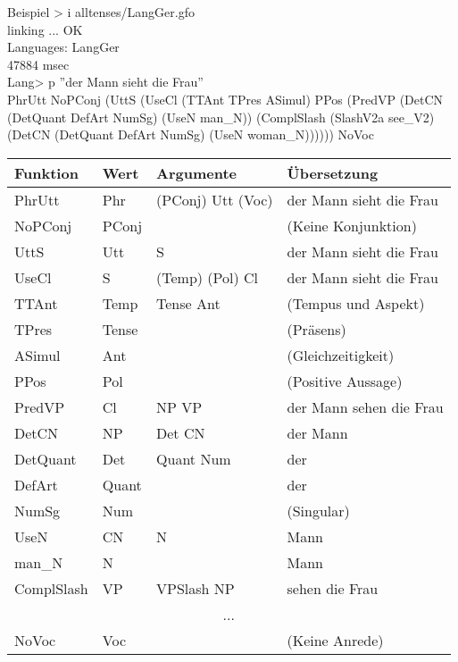 \documentclass{beamer}
\begin{document}
\begin{frame}

\begin{block}{Beispiel}
{\scriptsize\ttfamily
> i alltenses/LangGer.gfo \\
linking ... OK \\
Languages: LangGer \\
47884 msec \\
Lang> p ''der Mann sieht die Frau'' \\
PhrUtt NoPConj (UttS (UseCl (TTAnt TPres ASimul) PPos (PredVP (DetCN (DetQuant DefArt NumSg) (UseN man\_N)) (ComplSlash (SlashV2a see\_V2) (DetCN (DetQuant DefArt NumSg) (UseN woman\_N)))))) NoVoc
}
\end{block}
{\tiny
\begin{tabular}{|l|l|l|l|}
\hline
Funktion & Wert & Argumente & Übersetzung\\
\hline
PhrUtt & Phr & (PConj) Utt (Voc) & der Mann sieht die Frau \\
NoPConj & PConj &  & (Keine Konjunktion) \\
UttS & Utt & S & der Mann sieht die Frau \\
UseCl & S & (Temp) (Pol) Cl & der Mann sieht die Frau \\
TTAnt & Temp & Tense Ant & (Tempus und Aspekt) \\
TPres & Tense & & (Präsens) \\
ASimul & Ant & & (Gleichzeitigkeit) \\
PPos & Pol & & (Positive Aussage) \\
PredVP & Cl & NP VP & der Mann sehen die Frau \\
DetCN & NP & Det CN & der Mann \\
DetQuant & Det & Quant Num & der \\
DefArt & Quant & & der \\
NumSg & Num & & (Singular) \\
UseN & CN & N & Mann \\
man\_N & N & & Mann \\
ComplSlash & VP & VPSlash NP & sehen die Frau \\
\multicolumn{4}{|c|}{...} \\
NoVoc & Voc & & (Keine Anrede) \\
\hline
\end{tabular}
}
\end{frame}
\end{document}
